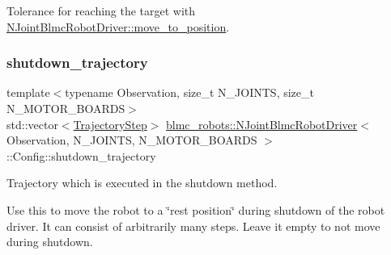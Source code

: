 Tolerance for reaching the target with \hyperlink{classblmc__robots_1_1NJointBlmcRobotDriver_ab29cab22a765bce463f367b6e6dc82ff}{N\+Joint\+Blmc\+Robot\+Driver\+::move\+\_\+to\+\_\+position}. 

\mbox{\label{structblmc__robots_1_1NJointBlmcRobotDriver_1_1Config_a1f241f65d2b50b3bb5b4b83837dbaae8}} 
\subsubsection{\texorpdfstring{shutdown\+\_\+trajectory}{shutdown\_trajectory}}
{\footnotesize\ttfamily template$<$typename Observation, size\+\_\+t N\+\_\+\+J\+O\+I\+N\+TS, size\+\_\+t N\+\_\+\+M\+O\+T\+O\+R\+\_\+\+B\+O\+A\+R\+DS$>$ \\
std\+::vector$<$\hyperlink{structblmc__robots_1_1NJointBlmcRobotDriver_1_1Config_1_1TrajectoryStep}{Trajectory\+Step}$>$ \hyperlink{classblmc__robots_1_1NJointBlmcRobotDriver}{blmc\+\_\+robots\+::\+N\+Joint\+Blmc\+Robot\+Driver}$<$ Observation, N\+\_\+\+J\+O\+I\+N\+TS, N\+\_\+\+M\+O\+T\+O\+R\+\_\+\+B\+O\+A\+R\+DS $>$\+::Config\+::shutdown\+\_\+trajectory}



Trajectory which is executed in the shutdown method. 

Use this to move the robot to a \char`\"{}rest position\char`\"{} during shutdown of the robot driver. It can consist of arbitrarily many steps. Leave it empty to not move during shutdown. \mbox{\label{structblmc__robots_1_1NJointBlmcRobotDriver_1_1Config_a18a496c6cf2f794930ee72f2746e223f}} 
